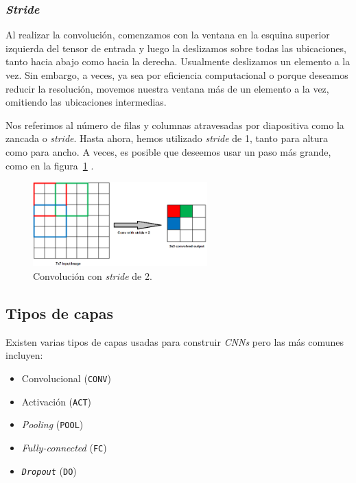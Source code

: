 \documentclass[a4paper,12pt]{article}
\begin{document}
\subsubsection{\textit{Stride}}

Al realizar la convolución, comenzamos con la ventana en la esquina superior izquierda del tensor de entrada y luego la deslizamos sobre todas las ubicaciones, tanto hacia abajo como hacia la derecha. Usualmente deslizamos un elemento a la vez. Sin embargo, a veces, ya sea por eficiencia computacional o porque deseamos reducir la resolución, movemos nuestra ventana más de un elemento a la vez, omitiendo las ubicaciones intermedias.

Nos referimos al número de filas y columnas atravesadas por diapositiva como la zancada o \textit{stride}. Hasta ahora, hemos utilizado \textit{stride} de 1, tanto para altura como para ancho. A veces, es posible que deseemos usar un paso más grande, como en la figura~\ref{fig:stride} \citep{Saha2020Oct}.

\begin{figure}[H]
	\begin{center}				
	\includegraphics[width=0.6\textwidth]{tesis_44.png}
  	\caption{Convolución con \textit{stride} de 2.}
  	\label{fig:stride}
  	\end{center}
\end{figure}

\subsection{Tipos de capas}
Existen varias tipos de capas usadas \citep{rosebrock2017deep} para construir \textit{CNNs} pero las más comunes incluyen:

\begin{itemize}[noitemsep, topsep=2pt]
	\item Convolucional (\texttt{CONV})
	\item Activación (\texttt{ACT})
	\item \textit{Pooling} (\texttt{POOL})
	\item \textit{Fully-connected} (\texttt{FC})
	\item \texttt{\textit{Dropout}} (\texttt{DO})
\end{itemize}
\end{document}
